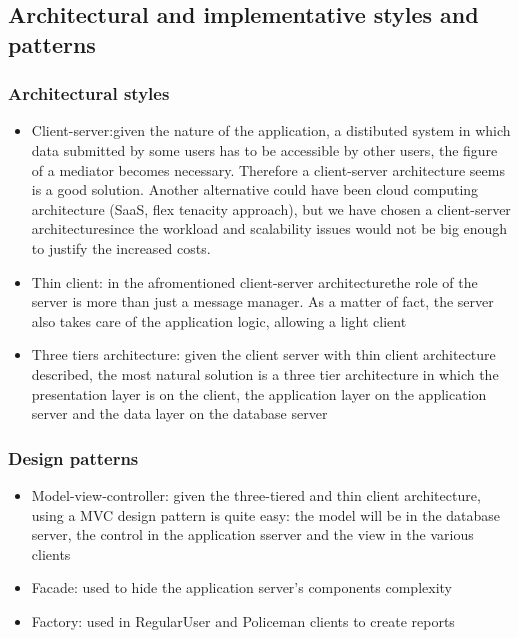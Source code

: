 \subsection{Architectural and implementative styles and patterns}
\subsubsection{Architectural styles}
\begin{itemize}
	\item Client-server:given the nature of the application, a distibuted system in which data submitted by some users has to be accessible by other users, the figure of a mediator becomes necessary. Therefore a client-server architecture seems is a good solution. Another alternative could have been cloud computing architecture (SaaS, flex tenacity approach), but we have chosen a client-server architecturesince the workload and scalability issues would not be big enough to justify the increased costs.
	\item Thin client: in the afromentioned client-server architecturethe role of the server is more than just a message manager. As a matter of fact, the server also takes care of the application logic, allowing a light client
	\item Three tiers architecture: given the client server with thin client architecture described, the most natural solution is a three tier architecture in which the presentation layer is on the client, the application layer on the application server and the data layer on the database server 
\end{itemize}
\subsubsection{Design patterns}
\begin{itemize}
	\item Model-view-controller: given the three-tiered and thin client architecture, using a MVC design pattern is quite easy: the model will be in the database server, the control in the application sserver and the view in the various clients
	\item Facade: used to hide the application server's components complexity
	\item Factory: used in RegularUser and Policeman clients to create reports
\end{itemize}
